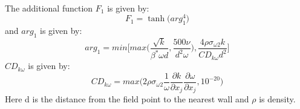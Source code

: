 \documentclass[a4paper, 12pt]{report}
\begin{document}
\\
The additional function $F_1$ is given by:
\begin{equation}
F_1 = \tanh\big(arg_1^4\big)
\end{equation}
and $arg_1$ is given by:
\begin{equation}
arg_1 = min\Big[max\big(\frac{\sqrt{k}}{\beta^* \omega d}, \frac{500 \nu}{d^2 \omega}\big), \frac{4 \rho \sigma_{\omega 2} k}{CD_{k \omega} d^2}\Big]
\end{equation}
$CD_{k\omega}$ is given by:
\begin{equation}
CD_{k\omega} = max\Big(2 \rho \sigma_{\omega 2} \frac{1}{\omega} \frac{\partial k}{\partial x_j}\frac{\partial \omega}{\partial x_j}, 10^{-20} \Big)
\end{equation}
Here d is the distance from the field point to the nearest wall and $\rho$ is density. 
\end{document}

